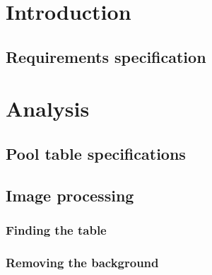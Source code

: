 
\usepackage{float}
\usepackage{graphicx}







\tableofcontents

\chapter{Introduction}
	\section{Requirements specification}
		

\chapter{Analysis}
	\section{Pool table specifications}
		\label{sec:rules}
		

\section{Image processing}
	\subsection{Finding the table}
		

	\subsection{Removing the background}
		





